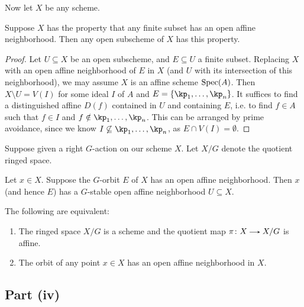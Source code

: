 Now let $X$ be any scheme.

\begin{lemma}
  \label{finite-affine-nbhd}
  Suppose $X$ has the property that any finite subset has an open affine neighborhood. Then any open subscheme of $X$ has this property.

  \begin{proof}
    Let $U \subseteq X$ be an open subscheme, and $E \subseteq U$ a finite subset. Replacing $X$ with an open affine neighborhood of $E$ in $X$ (and $U$ with its intersection of this neighborhood), we may assume $X$ is an affine scheme $\operatorname{Spec}(A)$. Then $X \setminus U = V(I)$ for some ideal $I$ of $A$ and $E = \{\kp_1,\ldots,\kp_n\}$. It suffices to find a distinguished affine $D(f)$ contained in $U$ and containing $E$, i.e. to find $f \in A$ such that $f \in I$ and $f \notin \kp_1,\ldots,\kp_n$. This can be arranged by prime avoidance, since we know $I \not\subseteq \kp_1, \ldots, \kp_n$, as $E \cap V(I) = \emptyset$.
  \end{proof}
\end{lemma}

\begin{nothing}
  \label{scheme-quotient}
   Suppose given a right $G$-action on our scheme $X$. Let $X/G$ denote the quotient ringed space.

   \begin{sublemma}
     \label{stable-open}
     Let $x \in X$. Suppose the $G$-orbit $E$ of $X$ has an open affine neighborhood. Then $x$ (and hence $E$) has a $G$-stable open affine neighborhood $U \subseteq X$.
   \end{sublemma}

   \begin{subproposition}
     \label{scheme-quotient-criterion}
     The following are equivalent:
     \begin{enumerate}
     \item \label{criterion-scheme} The ringed space $X/G$ is a scheme and the quotient map $\pi \c X \to X/G$ is affine.
     \item \label{criterion-orbit} The orbit of any point $x \in X$ has an open affine neighborhood in $X$.
     \end{enumerate}
   \end{subproposition}
\end{nothing}


\subsection*{Part (iv)}

